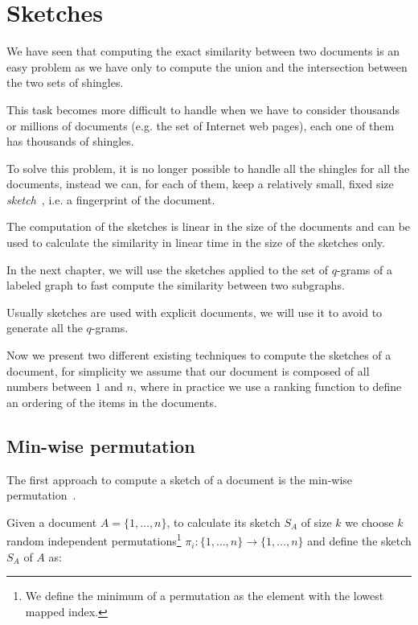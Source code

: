 \section{Sketches}

We have seen that computing the exact similarity between two documents is an easy problem
as we have only to compute the union and the intersection between the two sets of shingles.\medskip

This task becomes more difficult to handle when we have to consider thousands or millions of documents
(e.g. the set of Internet web pages), each one of them has thousands of shingles.\medskip

To solve this problem, it is no longer possible to handle all the shingles for all the documents,  
instead we can, for each of them, keep a relatively small, fixed size \textit{sketch}~\cite{Broder2000}, i.e. a fingerprint of the document.

The computation of the sketches is linear in the size of the documents and can be used to calculate the similarity in linear time in the size of the sketches only.\medskip

In the next chapter, we will use the sketches applied to the set of $q$-grams of a labeled graph to fast compute the similarity between two subgraphs.\medskip

Usually sketches are used with explicit documents, we will use it to avoid to generate all the $q$-grams.\bigskip

Now we present two different existing techniques to compute the sketches of a document, 
for simplicity we assume that our document is composed of all numbers between $1$ and $n$, where in practice we use a ranking function to define an ordering of the items in the documents.

\subsection*{Min-wise permutation}

The first approach to compute a sketch of a document is the min-wise permutation~\cite{Broder:1998:MIP:276698.276781}.\bigskip

Given a document $A = \{1, \ldots, n\}$, to calculate its sketch $S_{A}$ of size $k$ 
we choose $k$ random independent permutations\footnote{We define the minimum of a permutation as the element with the lowest mapped index.} $\pi_{i} : \{1, \ldots, n\} \rightarrow \{1, \ldots, n\}$ and define the sketch $S_A$ of $A$ as:

